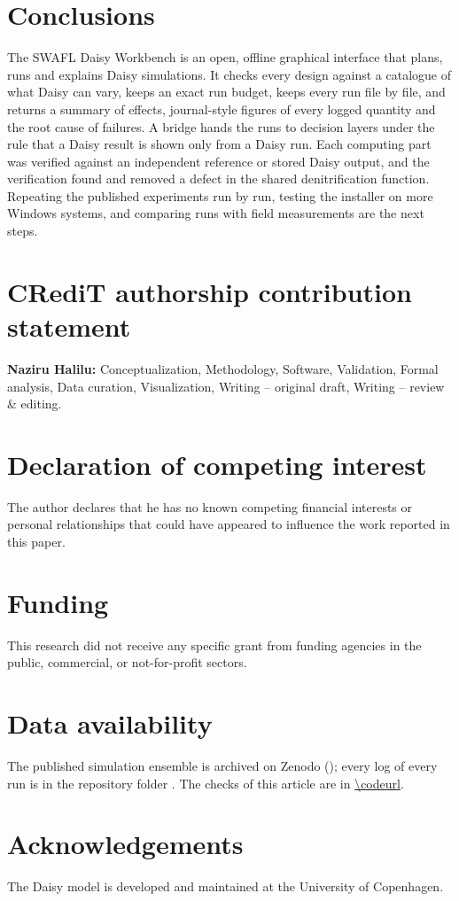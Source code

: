 \documentclass[preprint,12pt]{elsarticle}
\begin{document}

\section{Conclusions}
The SWAFL Daisy Workbench is an open, offline graphical interface that plans, runs and explains Daisy simulations. It checks every design against a catalogue of what Daisy can vary, keeps an exact run budget, keeps every run file by file, and returns a summary of effects, journal-style figures of every logged quantity and the root cause of failures. A bridge hands the runs to decision layers under the rule that a Daisy result is shown only from a Daisy run. Each computing part was verified against an independent reference or stored Daisy output, and the verification found and removed a defect in the shared denitrification function. Repeating the published experiments run by run, testing the installer on more Windows systems, and comparing runs with field measurements are the next steps.

\section*{CRediT authorship contribution statement}
\textbf{Naziru Halilu:} Conceptualization, Methodology, Software, Validation, Formal analysis, Data curation, Visualization, Writing -- original draft, Writing -- review \& editing.

\section*{Declaration of competing interest}
The author declares that he has no known competing financial interests or personal relationships that could have appeared to influence the work reported in this paper.

\section*{Funding}
This research did not receive any specific grant from funding agencies in the public, commercial, or not-for-profit sectors.

\section*{Data availability}
The published simulation ensemble is archived on Zenodo (); every log of every run is in the repository folder \cslink{}. The checks of this article are in \url{\codeurl}.

\section*{Acknowledgements}
The Daisy model is developed and maintained at the University of Copenhagen.



\end{document}
